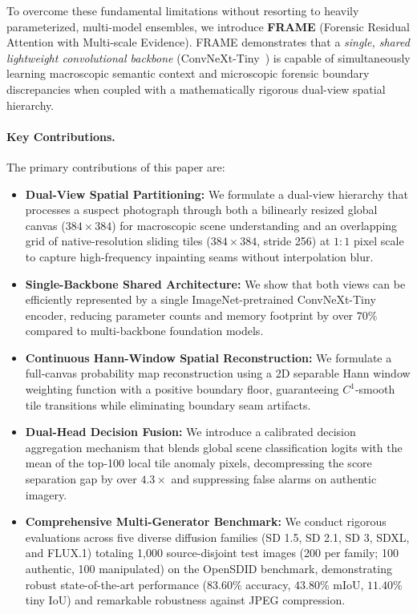 \documentclass[sigconf,review=true]{acmart}
\begin{document}
To overcome these fundamental limitations without resorting to heavily parameterized, multi-model ensembles, we introduce \textbf{FRAME} (Forensic Residual Attention with Multi-scale Evidence). FRAME demonstrates that a \emph{single, shared lightweight convolutional backbone} (ConvNeXt-Tiny~\cite{convnext}) is capable of simultaneously learning macroscopic semantic context and microscopic forensic boundary discrepancies when coupled with a mathematically rigorous dual-view spatial hierarchy.

\paragraph{Key Contributions.} The primary contributions of this paper are:
\begin{itemize}
    \item \textbf{Dual-View Spatial Partitioning:} We formulate a dual-view hierarchy that processes a suspect photograph through both a bilinearly resized global canvas ($384 \times 384$) for macroscopic scene understanding and an overlapping grid of native-resolution sliding tiles ($384 \times 384$, stride 256) at $1:1$ pixel scale to capture high-frequency inpainting seams without interpolation blur.
    \item \textbf{Single-Backbone Shared Architecture:} We show that both views can be efficiently represented by a single ImageNet-pretrained ConvNeXt-Tiny encoder, reducing parameter counts and memory footprint by over $70\%$ compared to multi-backbone foundation models.
    \item \textbf{Continuous Hann-Window Spatial Reconstruction:} We formulate a full-canvas probability map reconstruction using a 2D separable Hann window weighting function with a positive boundary floor, guaranteeing $C^1$-smooth tile transitions while eliminating boundary seam artifacts.
    \item \textbf{Dual-Head Decision Fusion:} We introduce a calibrated decision aggregation mechanism that blends global scene classification logits with the mean of the top-100 local tile anomaly pixels, decompressing the score separation gap by over $4.3\times$ and suppressing false alarms on authentic imagery.
    \item \textbf{Comprehensive Multi-Generator Benchmark:} We conduct rigorous evaluations across five diverse diffusion families (SD 1.5, SD 2.1, SD 3, SDXL, and FLUX.1) totaling 1,000 source-disjoint test images (200 per family; 100 authentic, 100 manipulated) on the OpenSDID benchmark, demonstrating robust state-of-the-art performance ($83.60\%$ accuracy, $43.80\%$ mIoU, $11.40\%$ tiny IoU) and remarkable robustness against JPEG compression.
\end{itemize}
\end{document}
